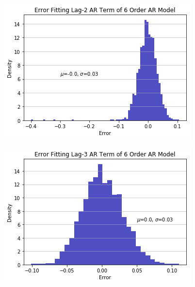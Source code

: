 \documentclass[oneside,12pt,openany]{book}
\begin{document}
	\begin{figure}[hbt!]
		\centering
		\includegraphics[width=.85\linewidth]{images/AR6ModelAR2CoefDist.png}
	\end{figure}
	\begin{figure}[hbt!]
		\centering
		\includegraphics[width=.85\linewidth]{images/AR6ModelAR3CoefDist.png}
	\end{figure}
	
\end{document}
